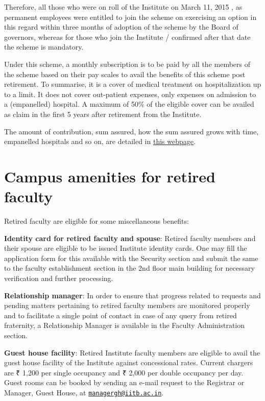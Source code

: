 \documentclass[
  10pt,
  a5paper,
  10pt,
  openany]{amsbook}
\begin{document}
Therefore, all those who were on roll of the Institute on March 11, 2015
, as permanent employees were entitled to join the scheme on exercising
an option in this regard within three months of adoption of the scheme
by the Board of governors, whereas for those who join the Institute /
confirmed after that date the scheme is mandatory.

Under this scheme, a monthly subscription is to be paid by all the
members of the scheme based on their pay scales to avail the benefits of
this scheme post retirement. To summarise, it is a cover of medical
treatment on hospitalization up to a limit. It does not cover
out-patient expenses, only expenses on admission to a (empanelled)
hospital. A maximum of 50\% of the eligible cover can be availed as
claim in the first 5 years after retirement from the Institute.

The amount of contribution, sum assured, how the sum assured grows with
time, empanelled hospitals and so on, are detailed in
\href{https://www.iitb.ac.in/sites/www.iitb.ac.in/files/Features\%20of\%20New\%20PRMS\%20Scheme.pdf}{this
webpage}.

\section{Campus amenities for retired
faculty}\label{campus-amenities-for-retired-faculty}

Retired faculty are eligible for some miscellaneous benefits:

\textbf{Identity card for retired faculty and spouse}: Retired faculty
members and their spouse are eligible to be issued Institute identity
cards. One may fill the application form for this available with the
Security section and submit the same to the faculty establishment
section in the 2nd floor main building for necessary verification and
further processing.

\textbf{Relationship manager}: In order to ensure that progress related
to requests and pending matters pertaining to retired faculty members
are monitored properly and to facilitate a single point of contact in
case of any query from retired fraternity, a Relationship Manager is
available in the Faculty Administration section.

\textbf{Guest house facility}: Retired Institute faculty members are
eligible to avail the guest house facility of the Institute against
concessional rates. Current chargers are ₹ 1,200 per single occupancy
and ₹ 2,000 per double occupancy per day. Guest rooms can be booked by
sending an e-mail request to the Registrar or Manager, Guest House, at
\href{mailto:managergh@iitb.ac.in}{\nolinkurl{managergh@iitb.ac.in}}.
\end{document}
